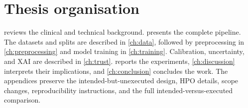 \documentclass[../preamble.tex]{subfiles}
\begin{document}
\section{Thesis organisation}
\label{sec:intro-organisation}

 reviews the clinical and technical background.
 presents the complete pipeline. The datasets and
splits are described in \cref{ch:data}, followed by preprocessing in
\cref{ch:preprocessing} and model training in \cref{ch:training}. Calibration,
uncertainty, and XAI are described in \cref{ch:trust}. 
reports the experiments, \cref{ch:discussion} interprets their implications,
and \cref{ch:conclusion} concludes the work. The appendices preserve the
intended-but-unexecuted design, HPO details, scope changes, reproducibility
instructions, and the full intended-versus-executed comparison.
\end{document}
